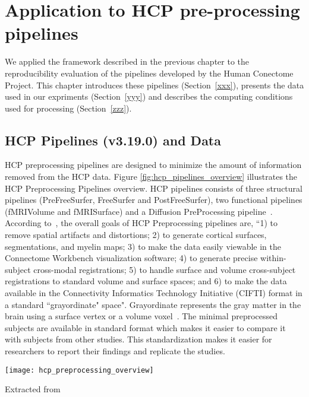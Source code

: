 \chapter{Application to HCP pre-processing pipelines}

We applied the framework described in the previous chapter to the
reproducibility evaluation of the pipelines developed by the Human
Conectome Project. This chapter introduces these pipelines
(Section~\ref{xxx}), presents the data used in our expriments
(Section~\ref{yyy}) and describes the computing conditions used for
processing (Section~\ref{zzz}).

\section{HCP Pipelines (v3.19.0) and Data}
HCP preprocessing pipelines are designed to minimize the amount of information removed from the HCP data. Figure \ref{fig:hcp_pipelines_overview} illustrates the HCP Preprocessing Pipelines overview. HCP pipelines consists of three structural pipelines (PreFreeSurfer, FreeSurfer and PostFreeSurfer), two functional pipelines (fMRIVolume and fMRISurface) and a Diffusion PreProcessing pipeline~\cite{Gla13}. According to~\cite{Gla13}, the overall goals of HCP Preprocessing pipelines are, ``1) to remove spatial artifacts and distortions; 2) to generate cortical surfaces, segmentations, and myelin maps; 3) to make the data easily viewable in the Connectome Workbench visualization software; 4) to generate precise within-subject cross-modal registrations; 5) to handle surface and volume cross-subject registrations to standard volume and surface spaces; and 6) to make the data available in the Connectivity Informatics Technology Initiative (CIFTI) format in a standard ``grayordinate" space". Grayordinate represents the gray matter in the brain using a surface vertex or a volume voxel~\cite{Grayordinate}. The minimal preprocessed subjects are available in standard format which makes it easier to compare it with subjects from other studies. This standardization makes it easier for researchers to report their findings and replicate the studies.

\begin{center}
   \texttt{[image: hcp\_preprocessing\_overview]}
   \label{fig:hcp_pipelines_overview}
   \caption*{Extracted from \cite{Gla13}}
\end{center}

